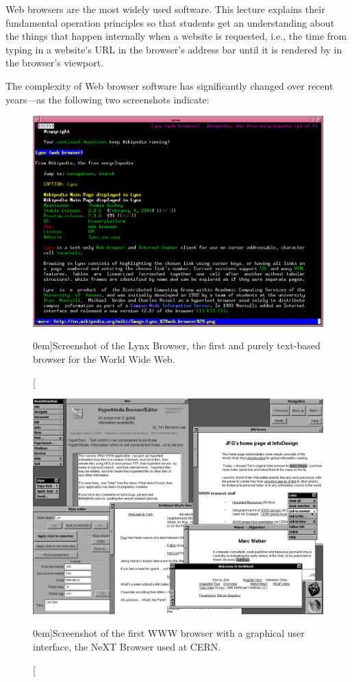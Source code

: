 \documentclass[a4paper, justified, notoc]{tufte-handout} %
\begin{document}
Web browsers are the most widely used software.
This lecture explains their fundamental operation principles so that students get an understanding about the things that happen internally when a website is requested, i.e., the time from typing in a website's URL in the browser's address bar until it is rendered by in the browser's viewport.

The complexity of Web browser software has significantly changed over recent years---as the following two screenshots indicate:

\begin{figure}%
	\centering
  \includegraphics[width=1.0\textwidth]{./figures/lynx_browser.png}
  \caption[][0em]{Screenshot of the Lynx Browser, the first and purely text-based browser for the World Wide Web.}
  \label{fig:lynx}
\end{figure}

\begin{figure}%
	\centering
  \includegraphics[width=1.0\textwidth]{./figures/next_browser.png}
  \caption[][0em]{Screenshot of the first WWW browser with a graphical user interface, the NeXT Browser used at CERN.}
  \label{fig:next_browser}
\end{figure}
\end{document}
